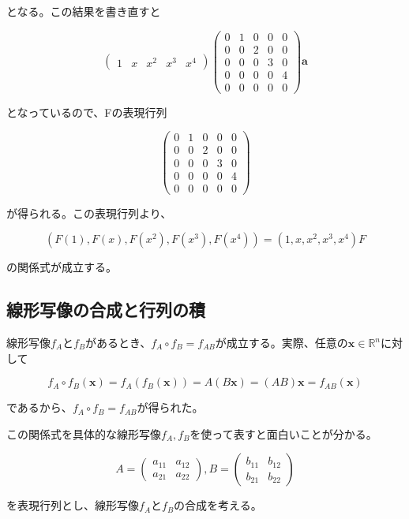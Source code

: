 \documentclass[dvipdfmx,autodetect-engine]{jsarticle}
\theoremstyle{definition}
\newcommand{\vecSpace}[1]{\mathbb{R}^{#1}}
\begin{document}
となる。この結果を書き直すと

$$
\begin{pmatrix}
1 & x & x^2 & x^3 & x^4
\end{pmatrix}
\begin{pmatrix}
0 & 1 & 0 & 0 & 0 \\
0 & 0 & 2 & 0 & 0 \\
0 & 0 & 0 & 3 & 0 \\
0 & 0 & 0 & 0 & 4 \\
0 & 0 & 0 & 0 & 0
\end{pmatrix}
\bm{a}
$$

となっているので、Fの表現行列

$$
\begin{pmatrix}
0 & 1 & 0 & 0 & 0 \\
0 & 0 & 2 & 0 & 0 \\
0 & 0 & 0 & 3 & 0 \\
0 & 0 & 0 & 0 & 4 \\
0 & 0 & 0 & 0 & 0
\end{pmatrix}
$$

が得られる。この表現行列より、

$$
(F(1), F(x), F(x^2), F(x^3), F(x^4)) = (1, x, x^2, x^3, x^4)F
$$

の関係式が成立する。


\subsection{線形写像の合成と行列の積}

線形写像$f_A$と$f_B$があるとき、$f_A \circ f_B = f_{AB}$が成立する。実際、任意の$\bm{x} \in \vecSpace{n}$に対して

$$
f_A \circ f_B(\bm{x}) = f_A(f_B(\bm{x})) = A(B\bm{x}) = (AB)\bm{x} = f_{AB}(\bm{x})
$$

であるから、$f_A \circ f_B = f_{AB}$が得られた。

この関係式を具体的な線形写像$f_A, f_B$を使って表すと面白いことが分かる。

$$
A = \begin{pmatrix}
a_{11} & a_{12} \\
a_{21} & a_{22}
\end{pmatrix}, 
B = \begin{pmatrix}
b_{11} & b_{12} \\
b_{21} & b_{22}
\end{pmatrix}
$$

を表現行列とし、線形写像$f_A$と$f_B$の合成を考える。
\end{document}
